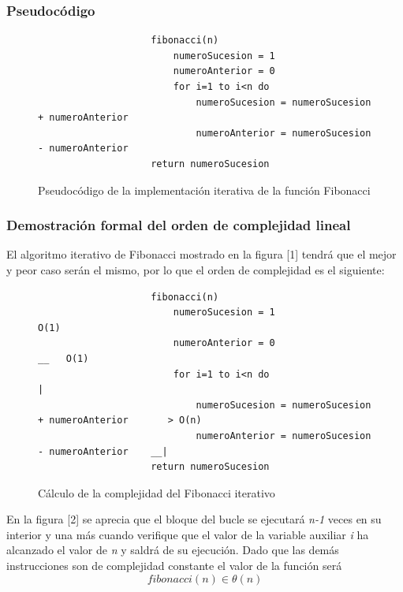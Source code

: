 \documentclass{report}
\begin{document}
        \subsubsection*{Pseudocódigo}
            \begin{figure}[!h]
                \begin{verbatim}
                    fibonacci(n)
                        numeroSucesion = 1
                        numeroAnterior = 0
                        for i=1 to i<n do
                            numeroSucesion = numeroSucesion + numeroAnterior
                            numeroAnterior = numeroSucesion - numeroAnterior
                    return numeroSucesion
                \end{verbatim}
                \caption{Pseudocódigo de la implementación iterativa de la función Fibonacci}
            \end{figure}
            
            
        \subsubsection*{Demostración formal del orden de complejidad lineal}
            
            El algoritmo iterativo de Fibonacci mostrado en la figura [1] tendrá que el mejor y peor caso serán el mismo, por lo que el orden de complejidad es el siguiente:
            \begin{figure}[!h]
                \begin{verbatim}
                    fibonacci(n)
                        numeroSucesion = 1                                           O(1)
                        numeroAnterior = 0                                      __   O(1)
                        for i=1 to i<n do                                         |
                            numeroSucesion = numeroSucesion + numeroAnterior       > O(n)
                            numeroAnterior = numeroSucesion - numeroAnterior    __|
                    return numeroSucesion
                \end{verbatim}
                \caption{Cálculo de la complejidad del Fibonacci iterativo}
            \end{figure}
            
            En la figura [2] se aprecia que el bloque del bucle se ejecutará \textit{n-1} veces en su interior y una más cuando verifique que el valor de la variable auxiliar \textit{i} ha alcanzado el valor de \textit{n} y saldrá de su ejecución. Dado que las demás instrucciones son de complejidad constante el valor de la función será $$fibonacci(n) \in \theta (n)$$
        
\end{document}
